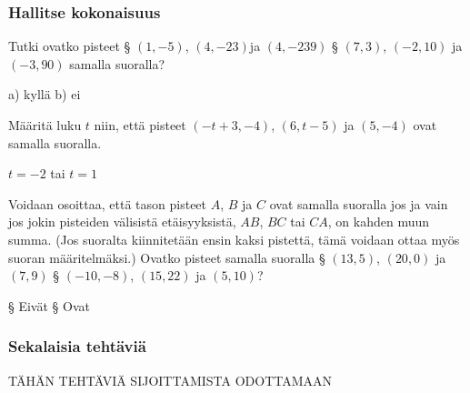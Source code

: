 \begin{tehtavasivu}
\subsubsection*{Hallitse kokonaisuus}

\begin{tehtava}
Tutki ovatko pisteet  
\alakohdat
§ $(1, -5)$, $(4, -23)$ja $(4, -239)$
§ $(7, 3)$, $(-2, 10)$ ja $(-3, 90)$ samalla suoralla?
\loppu
\begin{vastaus}
a) kyllä b) ei
\end{vastaus}
\end{tehtava}

\begin{tehtava}
Määritä luku $t$ niin, että pisteet $(-t+3, -4)$, $(6, t-5)$ ja $(5, -4)$ ovat samalla suoralla.
\begin{vastaus}
$t=-2$ tai $t=1$
\end{vastaus}
\end{tehtava}

\begin{tehtava}
Voidaan osoittaa, että tason pisteet $A$, $B$ ja $C$ ovat samalla suoralla jos ja vain jos jokin pisteiden välisistä etäisyyksistä, $AB$, $BC$ tai $CA$, on kahden muun summa. (Jos suoralta kiinnitetään ensin kaksi pistettä, tämä voidaan ottaa myös suoran määritelmäksi.) Ovatko pisteet samalla suoralla
	\alakohdat
		§ $(13,5)$, $(20,0)$ ja $(7,9)$
		§ $(-10,-8)$, $(15,22)$ ja $(5,10)$?
	\loppu
	\begin{vastaus}
		\alakohdat
			§ Eivät
			§ Ovat
		\loppu
	\end{vastaus}
\end{tehtava}

\subsubsection*{Sekalaisia tehtäviä}

TÄHÄN TEHTÄVIÄ SIJOITTAMISTA ODOTTAMAAN

\end{tehtavasivu}
